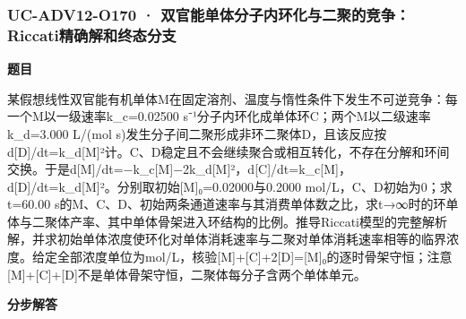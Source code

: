 \documentclass[UTF8,11pt,a4paper]{ctexart}
\begin{document}
\subsubsection*{UC-ADV12-O170 · 双官能单体分子内环化与二聚的竞争：Riccati精确解和终态分支}
\noindent\textbf{题目}\par
某假想线性双官能有机单体M在固定溶剂、温度与惰性条件下发生不可逆竞争：每一个M以一级速率k\_c=0.02500 s⁻¹分子内环化成单体环C；两个M以二级速率k\_d=3.000 L/(mol s)发生分子间二聚形成非环二聚体D，且该反应按d[D]/dt=k\_d[M]²计。C、D稳定且不会继续聚合或相互转化，不存在分解和环间交换。于是d[M]/dt=−k\_c[M]−2k\_d[M]²，d[C]/dt=k\_c[M]，d[D]/dt=k\_d[M]²。分别取初始[M]₀=0.02000与0.2000 mol/L，C、D初始为0；求t=60.00 s的M、C、D、初始两条通道速率与其消费单体数之比，求t→∞时的环单体与二聚体产率、其中单体骨架进入环结构的比例。推导Riccati模型的完整解析解，并求初始单体浓度使环化对单体消耗速率与二聚对单体消耗速率相等的临界浓度。给定全部浓度单位为mol/L，核验[M]+[C]+2[D]=[M]₀的逐时骨架守恒；注意[M]+[C]+[D]不是单体骨架守恒，二聚体每分子含两个单体单元。\par
\medskip\noindent\textbf{分步解答}
\end{document}
